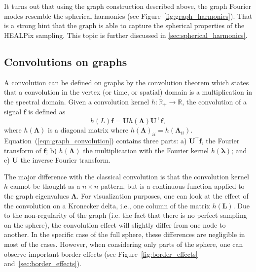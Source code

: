 \documentclass[final,twocolumn,3p,times,authoryear]{elsarticle}
\newcommand{\figref}[1]{Figure~\ref{fig:#1}}
\newcommand{\eqnref}[1]{(\ref{eqn:#1})}
\renewcommand{\b}[1]{{\bm{#1}}}   %
\newcommand{\1}{\b{1}}              %
\newcommand{\0}{\b{0}}              %
\renewcommand{\L}{\b{L}}
\newcommand{\U}{\b{U}}
\newcommand{\trans}{^\intercal}
\newcommand{\R}{\mathbb{R}}
\newcommand{\bLambda}{\b{\Lambda}}
\newcommand{\blambda}{\b{\lambda}}
\begin{document}
It turns out that using the graph construction described above, the graph Fourier modes resemble the spherical harmonics (see \figref{graph_harmonics}). That is a strong hint that the graph is able to capture the spherical properties of the HEALPix sampling. This topic is further discussed in \ref{sec:spherical_harmonics}.

\subsection{Convolutions on graphs}

A convolution can be defined on graphs by the convolution theorem which states that a convolution in the vertex (or time, or spatial) domain is a
multiplication in the spectral domain. Given a convolution kernel
$h: \R_+ \rightarrow \R$, the convolution of a signal $\b{f}$
is defined as
\begin{equation} \label{eqn:graph_convolution}
h(L)\b{f} = \U h(\bLambda) \U\trans \b{f},
\end{equation}
where $h(\bLambda)$ is a diagonal matrix where $h(\bLambda)_{ii}=h(\bLambda_{ii})$.
Equation~\eqnref{graph_convolution} contains three parts: a) $\U\trans \b{f}$, the
Fourier transform of $\b{f}$; b) $h(\bLambda)$ the multiplication with the Fourier
kernel $h(\blambda)$; and c) $\U$ the inverse Fourier transform.

The major difference with the classical convolution is that the convolution kernel
$h$ cannot be thought as a $n \times n$ pattern, but is a continuous function
applied to the graph eigenvalues $\bLambda$. For visualization purposes, one can
look at the effect of the convolution on a Kronecker delta, i.e., one column of the matrix
$h(\L)$.
Due to the non-regularity of the graph (i.e. the fact
that there is no perfect sampling on the sphere), the convolution effect will slightly
differ from one node to another. In the specific case of the full sphere, these
differences are negligible in most of the cases. However, when considering only parts of
the sphere, one can observe important border effects (see \figref{border_effects} and~\ref{sec:border_effects}).
\end{document}
